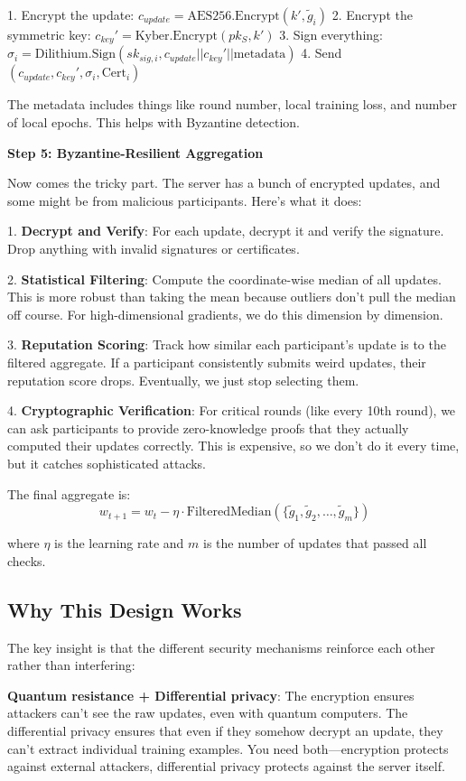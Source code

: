 \documentclass[journal,onecolumn]{IEEEtran}
\begin{document}
1. Encrypt the update: $c_{update} = \text{AES256.Encrypt}(k', \tilde{g}_i)$
2. Encrypt the symmetric key: $c_{key}' = \text{Kyber.Encrypt}(pk_S, k')$
3. Sign everything: $\sigma_i = \text{Dilithium.Sign}(sk_{sig,i}, c_{update} || c_{key}' || \text{metadata})$
4. Send $(c_{update}, c_{key}', \sigma_i, \text{Cert}_i)$

The metadata includes things like round number, local training loss, and number of local epochs. This helps with Byzantine detection.

\textbf{Step 5: Byzantine-Resilient Aggregation}

Now comes the tricky part. The server has a bunch of encrypted updates, and some might be from malicious participants. Here's what it does:

1. \textbf{Decrypt and Verify}: For each update, decrypt it and verify the signature. Drop anything with invalid signatures or certificates.

2. \textbf{Statistical Filtering}: Compute the coordinate-wise median of all updates. This is more robust than taking the mean because outliers don't pull the median off course. For high-dimensional gradients, we do this dimension by dimension.

3. \textbf{Reputation Scoring}: Track how similar each participant's update is to the filtered aggregate. If a participant consistently submits weird updates, their reputation score drops. Eventually, we just stop selecting them.

4. \textbf{Cryptographic Verification}: For critical rounds (like every 10th round), we can ask participants to provide zero-knowledge proofs that they actually computed their updates correctly. This is expensive, so we don't do it every time, but it catches sophisticated attacks.

The final aggregate is:
$$w_{t+1} = w_t - \eta \cdot \text{FilteredMedian}(\{\tilde{g}_1, \tilde{g}_2, \ldots, \tilde{g}_m\})$$

where $\eta$ is the learning rate and $m$ is the number of updates that passed all checks.

\subsection{Why This Design Works}

The key insight is that the different security mechanisms reinforce each other rather than interfering:

\textbf{Quantum resistance + Differential privacy}: The encryption ensures attackers can't see the raw updates, even with quantum computers. The differential privacy ensures that even if they somehow decrypt an update, they can't extract individual training examples. You need both—encryption protects against external attackers, differential privacy protects against the server itself.
\end{document}
